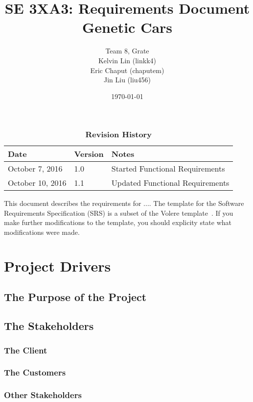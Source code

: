 \documentclass[12pt, titlepage]{article}
\title{SE 3XA3: Requirements Document\\Genetic Cars}
\author{Team 8, Grate
		\\ Kelvin Lin (linkk4)
		\\ Eric Chaput (chaputem)
		\\ Jin Liu (liu456)
}
\date{\today}
\begin{document}
\maketitle

\tableofcontents
\listoftables
\listoffigures

\begin{table}[bp]
\caption{\bf Revision History}
\begin{tabularx}{\textwidth}{p{3.5cm}p{2cm}X}
\toprule {\bf Date} & {\bf Version} & {\bf Notes}\\
\midrule
October 7, 2016 & 1.0 & Started Functional Requirements\\
October 10, 2016 & 1.1 & Updated Functional Requirements\\
\bottomrule
\end{tabularx}
\end{table}

\newpage


This document describes the requirements for ....  The template for the Software
Requirements Specification (SRS) is a subset of the Volere
template~\citep{RobertsonAndRobertson2012}.  If you make further modifications
to the template, you should explicity state what modifications were made.

\section{Project Drivers}

\subsection{The Purpose of the Project}

\subsection{The Stakeholders}

\subsubsection{The Client}

\subsubsection{The Customers}

\subsubsection{Other Stakeholders}
\end{document}
